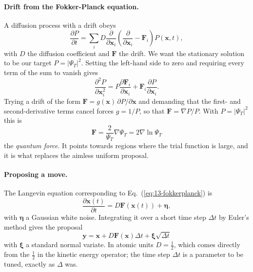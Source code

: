 \paragraph{Drift from the Fokker-Planck equation.}
A diffusion process with a drift obeys
\begin{equation}
  \frac{\partial P}{\partial t}
   = \sum_i D\frac{\partial}{\partial \bm{x}_i}
     \left(\frac{\partial}{\partial \bm{x}_i} - \bm{F}_i\right)P(\bm{x},t),
  \label{eq:13-fokkerplanck}
\end{equation}
with $D$ the diffusion coefficient and $\bm{F}$ the drift.  We want the
stationary solution to be our target $P=|\Psi_T|^2$.  Setting the left-hand
side to zero and requiring every term of the sum to vanish gives
\begin{equation}
  \frac{\partial^2 P}{\partial \bm{x}_i^2}
   = P\frac{\partial \bm{F}_i}{\partial \bm{x}_i}
   + \bm{F}_i\frac{\partial P}{\partial \bm{x}_i} .
  \label{eq:13-stationary}
\end{equation}
Trying a drift of the form $\bm{F}=g(\bm{x})\,\partial P/\partial\bm{x}$ and
demanding that the first- and second-derivative terms cancel forces
$g=1/P$, so that $\bm{F}=\nabla P/P$.  With $P=|\Psi_T|^2$ this is
\begin{equation}
  \boxed{\;\bm{F} = \frac{2}{\Psi_T}\nabla\Psi_T = 2\nabla\ln\Psi_T\;}
  \label{eq:13-quantumforce}
\end{equation}
the \emph{quantum force}.  It points towards regions where the trial function
is large, and it is what replaces the aimless uniform proposal.

\paragraph{Proposing a move.}
The Langevin equation corresponding to Eq.~(\ref{eq:13-fokkerplanck}) is
\begin{equation}
  \frac{\partial \bm{x}(t)}{\partial t} = D\bm{F}(\bm{x}(t)) + \bm{\eta},
  \label{eq:13-langevin}
\end{equation}
with $\bm{\eta}$ a Gaussian white noise.  Integrating it over a short time
step $\Delta t$ by Euler's method gives the proposal
\begin{equation}
  \boxed{\;
  \bm{y} = \bm{x} + D\bm{F}(\bm{x})\Delta t
    + \bm{\xi}\sqrt{\Delta t} \;}
  \label{eq:13-proposal}
\end{equation}
with $\bm{\xi}$ a standard normal variate.  In atomic units $D=\tfrac12$,
which comes directly from the $\tfrac12$ in the kinetic energy operator; the
time step $\Delta t$ is a parameter to be tuned, exactly as $\Delta$ was.

